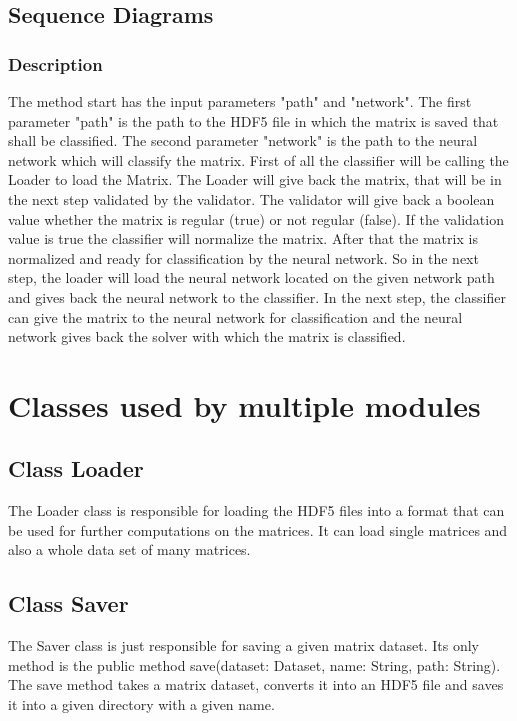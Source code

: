 \documentclass[parskip=full]{scrartcl}
\begin{document}
 
\newpage
\subsection{Sequence Diagrams} 

\begin{figure}[h]
\begin{center}

\label{Sequence Diagrams}
\end{center}
\end{figure}

\newpage
\subsubsection{Description}
The method start has the input parameters "path" and "network".
The first parameter "path" is the path to the \gls{HDF5} file in which the matrix is saved that shall be classified.
The second parameter "network" is the path to the \gls{neural network} which will classify the matrix.
First of all the classifier will be calling the Loader to load the Matrix.
The Loader will give back the matrix, that will be in the next step validated by the validator. 
The validator will give back a boolean value whether the matrix is regular (true) or not regular (false).
If the validation value is true the classifier will normalize the matrix. 
After that the matrix is normalized and ready for classification by the \gls{neural network}.
So in the next step, the loader will load the \gls{neural network} located on the given network path and gives back the \gls{neural network} to the classifier.
In the next step, the classifier can give the matrix to the \gls{neural network} for classification and the \gls{neural network} gives back the  solver with which the matrix is classified.


\newpage
\section{Classes used by multiple modules}

\subsection{Class Loader}
The Loader class is responsible for loading the \gls{HDF5} files into a format that can be used for further computations on the matrices.
It can load single matrices and also a whole data set of many matrices.
\subsection{Class Saver}
The Saver class is just responsible for saving a given matrix dataset.
Its only method is the public method save(dataset: Dataset, name: String, path: String).
The save method takes a matrix dataset, converts it into an \gls{HDF5} file and saves it into a given directory with a given name.
\end{document}
